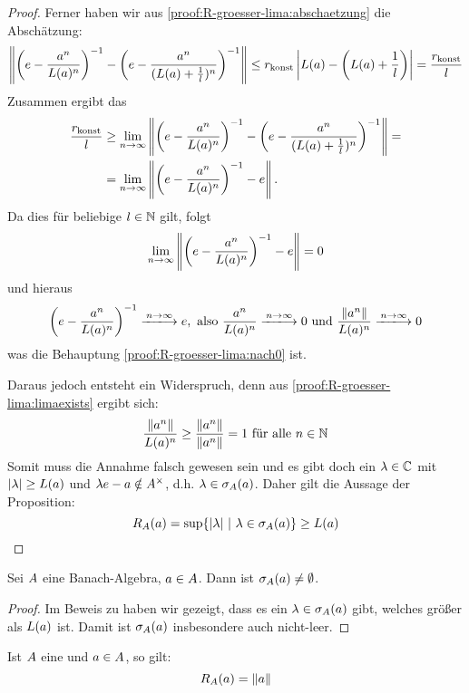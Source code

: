 \begin{proof}
Ferner haben wir aus \ref{proof:R-groesser-lima:abschaetzung} die Abschätzung:
	\[\left\lVert\left(e - \frac{a^n}{L(a)^n}\right)^{-1} - \left(e - \frac{a^n}{(L(a) + \frac{1}{l})^n}\right)^{-1}\right\rVert \leq r_\textup{konst}\left|L(a)-\left(L(a)+\frac{1}{l}\right)\right| = \frac{r_\textup{konst}}{l}\]
Zusammen ergibt das
	\begin{align*}\frac{r_\textup{konst}}{l} &\geq \underset{n\to\infty}{\lim} \left\lVert\left(e - \frac{a^n}{L(a)^n}\right)^{-1} - \left(e - \frac{a^n}{(L(a) + \frac{1}{l})^n}\right)^{-1}\right\rVert = \\
	&= \underset{n\to\infty}{\lim} \left\lVert\left(e - \frac{a^n}{L(a)^n}\right)^{-1} - e\right\rVert.
	\end{align*}
Da dies für beliebige $l \in \mathbb{N}$ gilt, folgt
	\[\underset{n\to\infty}{\lim} \left\lVert\left(e - \frac{a^n}{L(a)^n}\right)^{-1} - e\right\rVert = 0\]
und hieraus
	\[\left(e - \frac{a^n}{\lima^n}\right)^{-1} \xlongrightarrow{n\to\infty} e, \text{ also } \frac{a^n}{\lima^n} \xlongrightarrow{n\to\infty} 0 \text{ und } \frac{\norm{a^n}}{\lima^n} \xlongrightarrow{n\to\infty} 0\]
was die Behauptung \ref{proof:R-groesser-lima:nach0} ist.	

Daraus jedoch entsteht ein Widerspruch, denn aus \ref{proof:R-groesser-lima:limaexists} ergibt sich: 
	\[\frac{\left\lVert a^n\right\rVert}{L(a)^n} \geq \frac{\left\lVert a^n\right\rVert}{\left\lVert a^n\right\rVert} = 1 \text{ für alle } n\in \mathbb{N}\]
Somit muss die Annahme falsch gewesen sein und es gibt doch ein $\lambda \in \mathbb{C}$ mit $|\lambda| \geq L(a)$ und $\lambda e - a \notin A^\times$, d.h. $\lambda \in \sigma_A(a)$. Daher gilt die Aussage der Proposition:
	\[R_A(a) = \sup\{|\lambda| ~|~ \lambda \in \sigma_A(a)\} \geq L(a) \qedhere\]
\end{proof}


\begin{kor}\label{kor:spektrum-nicht-leer}
Sei $A$ eine Banach-Algebra, $a \in A$. Dann ist $\sigma_A(a) \neq \emptyset$.
\end{kor}

\begin{proof}
Im Beweis zu  haben wir gezeigt, dass es ein $\lambda \in \sigma_A(a)$ gibt, welches größer als $L(a)$ ist. Damit ist $\sigma_A(a)$ insbesondere auch nicht-leer.
\end{proof}

\begin{prop}\label{prop:R-gleich-Norm}
Ist $A$ eine \CAlg{} und $a \in A$, so gilt: 
	\[R_A(a) = \left\lVert a\right\rVert\]
\end{prop}

